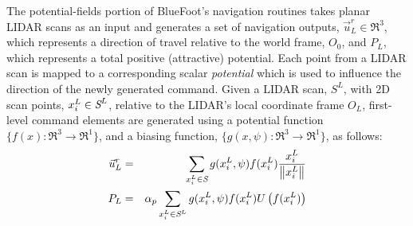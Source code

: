 			The potential-fields portion of BlueFoot's navigation routines takes planar LIDAR scans as an input and generates a set of navigation outputs, $\vec{u}^{r}_{L} \in \Re^{3}$, which represents a direction of travel relative to the world frame, $O_{0}$, and $P_{L}$, which represents a total positive (attractive) potential. Each point from a LIDAR scan is mapped to a corresponding scalar \emph{potential} which is used to influence the direction of the newly generated command. Given a LIDAR scan, $S^{L}$, with 2D scan points, $x_{i}^{L}\in\emph{S}^{L}$, relative to the LIDAR's local coordinate frame $O_{L}$, first-level command elements are generated using a potential function $\{ f(x) : \Re^{3}\rightarrow \Re^{1} \}$, and a biasing function, $\{ g(x,\psi) : \Re^{3}\rightarrow \Re^{1} \}$, as follows:
				\begin{eqnarray}
				\vec{u}^{r}_{L} &=&  { \sum_{x_{i}^{L} \in \emph{S}} g( x_{i}^{L},\psi)  f( x_{i}^{L} ) \frac{x_{i}^{L}}{\left\lVert x_{i}^{L}\right\rVert} } \nonumber \\
				P_{L} & = & \alpha_{p}\sum_{x_{i}^{L} \in \emph{S}^{L}} g( x_{i}^{L},\psi)  f( x_{i}^{L} ) U\left(f( x_{i}^{L} )\right)
				\end{eqnarray}

